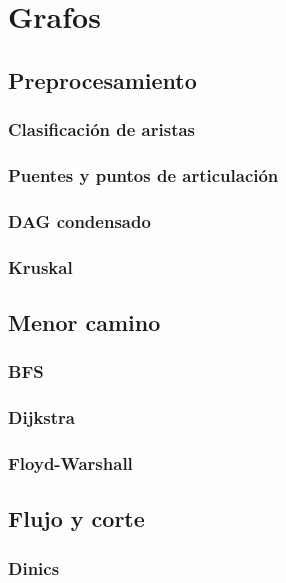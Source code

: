 \section{Grafos}
\subsection{Preprocesamiento}
    \subsubsection{Clasificación de aristas}
    \subsubsection{Puentes y puntos de articulación}
    \subsubsection{DAG condensado}
    \subsubsection{Kruskal}
\subsection{Menor camino}
    \subsubsection{BFS}
    \subsubsection{Dijkstra}
    \subsubsection{Floyd-Warshall}
\subsection{Flujo y corte}
    \subsubsection{Dinics}
